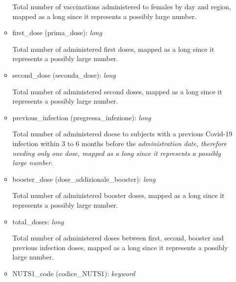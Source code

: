 \documentclass[12pt, a4paper]{article}
\begin{document}
\begin{itemize}
\begin{itemize}
        \begin{footnotesize}
          Total number of vaccinations administered to females by day and region, mapped
          as a long since it represents a possibly large number.
        \end{footnotesize}
      \item first\_dose (prima\_dose): \emph{long} \\
        \begin{footnotesize}
          Total number of administered first doses, mapped as a long since it represents
          a possibly large number.
        \end{footnotesize}
      \item second\_dose (seconda\_dose): \emph{long} \\
        \begin{footnotesize}
          Total number of administered second doses, mapped as a long since it represents
          a possibly large number.
        \end{footnotesize}
      \item previous\_infection (pregressa\_infezione): \emph{long} \\
        \begin{footnotesize}
          Total number of administered doese to subjects with a previous Covid-19 
          infection within 3 to 6 months before the \it{administration date}, therefore 
          needing only one dose, mapped as a long since it represents a possibly large 
          number. 
        \end{footnotesize}
      \item booster\_dose (dose\_addizionale\_booster): \emph{long} \\
        \begin{footnotesize}
          Total number of administered booster doses, mapped as a long since it 
          represents a possibly large number.
        \end{footnotesize}
      \item total\_doses: \emph{long} \\
        \begin{footnotesize}
          Total number of administered doses between first, second, booster and previous 
          infection doses, mapped as a long since it represents a possibly large number.
        \end{footnotesize}
      \item NUTS1\_code (codice\_NUTS1): \emph{keyword} \\

\end{itemize}
\end{itemize}
\end{document}
